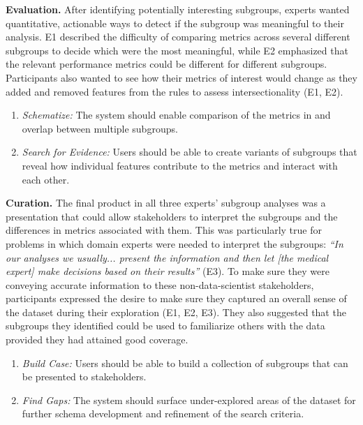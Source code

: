 \textbf{Evaluation.} After identifying potentially interesting subgroups, experts wanted quantitative, actionable ways to detect if the subgroup was meaningful to their analysis.
E1 described the difficulty of comparing metrics across several different subgroups to decide which were the most meaningful, while E2 emphasized that the relevant performance metrics could be different for different subgroups.
Participants also wanted to see how their metrics of interest would change as they added and removed features from the rules to assess intersectionality (E1, E2).

\begin{enumerate}[label={\bfseries T\arabic*.}, ref={\bfseries T\arabic*},itemsep=1ex]
    \setcounter{enumi}{\value{goalCounter}}
    \item \textit{Schematize:} The system should enable comparison of the metrics in and overlap between multiple subgroups. \label{task:schematize}
    \item \textit{Search for Evidence:} Users should be able to create variants of subgroups that reveal how individual features contribute to the metrics and interact with each other. \label{task:search-evidence}
    \setcounter{goalCounter}{\value{enumi}}
\end{enumerate}

\textbf{Curation.} The final product in all three experts' subgroup analyses was a presentation that could allow stakeholders to interpret the subgroups and the differences in metrics associated with them.
This was particularly true for problems in which domain experts were needed to interpret the subgroups: \textit{``In our analyses we usually... present the information and then let [the medical expert] make decisions based on their results''} (E3).
To make sure they were conveying accurate information to these non-data-scientist stakeholders, participants expressed the desire to make sure they captured an overall sense of the dataset during their exploration (E1, E2, E3).
They also suggested that the subgroups they identified could be used to familiarize others with the data provided they had attained good coverage.
\begin{enumerate}[label={\bfseries T\arabic*.}, ref={\bfseries T\arabic*},itemsep=1ex]
    \setcounter{enumi}{\value{goalCounter}}
    \item \textit{Build Case:} Users should be able to build a collection of subgroups that can be presented to stakeholders.\label{task:build-case}
    \item \textit{Find Gaps:} The system should surface under-explored areas of the dataset for further schema development and refinement of the search criteria.\label{task:find-gaps}
\end{enumerate}